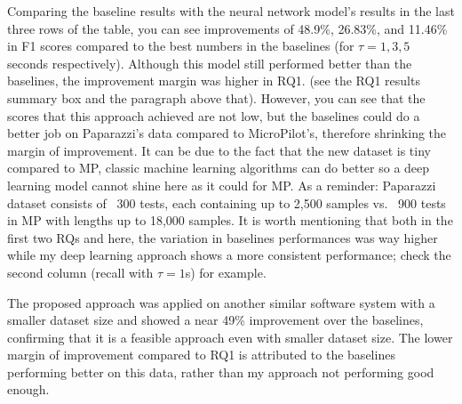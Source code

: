 Comparing the baseline results with the neural network model's results in the last three rows of the table, you can see improvements of 48.9\%, 26.83\%, and 11.46\% in F1 scores compared to the best numbers in the baselines (for $\tau = 1, 3, 5$ seconds respectively). Although this model still performed better than the baselines, the improvement margin was higher in RQ1. (see the RQ1 results summary box and the paragraph above that). %
However, you can see that the scores that this approach achieved are not low, but the baselines could do a better job on Paparazzi's data compared to MicroPilot's, therefore shrinking the margin of improvement. 
It can be due to the fact that the new dataset is tiny compared to MP, classic machine learning algorithms can do better so a deep learning model cannot shine here as it could for MP. 
As a reminder: Paparazzi dataset consists of ~300 tests, each containing up to 2,500 samples vs. ~900 tests in MP with lengths up to 18,000 samples. 
It is worth mentioning that both in the first two RQs and here, the variation in baselines performances was way higher while my deep learning approach shows a more consistent performance; check the second column (recall with $\tau=1$s) for example. 

\begin{rqanswer}
The proposed approach was applied on another similar software system with a smaller dataset size and showed a near 49\% improvement over the baselines, confirming that it is a feasible approach even with smaller dataset size. The lower margin of improvement compared to RQ1 is attributed to the baselines performing better on this data, rather than my approach not performing good enough.
\end{rqanswer}

